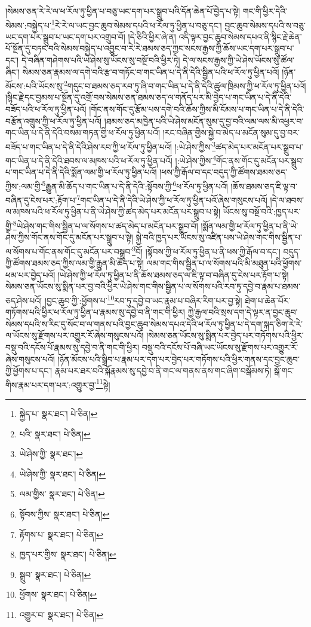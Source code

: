 །སེམས་ཅན་རེ་རེ་ལ་ཕ་རོལ་ཏུ་ཕྱིན་པ་བཅུ་ཡང་དག་པར་སྒྲུབ་པའི་དོན་ཆེན་པོ་བྱེད་པ་སྟེ། གང་གི་ཕྱིར་དེའི་སེམས་:བསྐྱེད་པ་\footnote{སྐྱེད་པ་  སྣར་ཐང་།  པེ་ཅིན། }རེ་རེ་ལ་ཡང་བྱང་ཆུབ་སེམས་དཔའི་ཕ་རོལ་ཏུ་ཕྱིན་པ་བཅུ་དང་། བྱང་ཆུབ་སེམས་དཔའི་ས་བཅུ་ཡང་དག་པར་སྒྲུབ་པ་ཡང་དག་པར་འགྲུབ་བོ། །དེ་ཅིའི་ཕྱིར་ཞེ་ན། འདི་ལྟར་བྱང་ཆུབ་སེམས་དཔའ་ནི་སྙིང་རྗེ་ཆེན་པོ་སྔོན་དུ་བཏང་བའི་སེམས་བསྐྱེད་པ་འབྱུང་བ་རེ་རེ་ཐམས་ཅད་ཀྱང་སངས་རྒྱས་ཀྱི་ཆོས་ཡང་དག་པར་སྒྲུབ་པ་དང་། དེ་བཞིན་གཤེགས་པའི་ཡེ་ཤེས་སུ་ཡོངས་སུ་བསྔོ་བའི་ཕྱིར་ཏེ། དེ་ལ་སངས་རྒྱས་ཀྱི་ཡེ་ཤེས་ཡོངས་སུ་ཚོལ་ཞིང་། སེམས་ཅན་རྣམས་ལ་དགེ་བའི་རྩ་བ་གཏོང་བ་གང་ཡིན་པ་དེ་ནི་དེའི་སྦྱིན་པའི་ཕ་རོལ་ཏུ་ཕྱིན་པའོ། །ཉོན་མོངས་:པའི་ཡོངས་སུ་\footnote{པའི་  སྣར་ཐང་།  པེ་ཅིན། }གདུང་བ་ཐམས་ཅད་རབ་ཏུ་ཞི་བ་གང་ཡིན་པ་དེ་ནི་དེའི་ཚུལ་ཁྲིམས་ཀྱི་ཕ་རོལ་ཏུ་ཕྱིན་པའོ། །སྙིང་རྗེ་དང་བྱམས་པ་སྔོན་དུ་འགྲོ་བས་སེམས་ཅན་ཐམས་ཅད་ལ་གནོད་པར་མི་བྱེད་པ་གང་ཡིན་པ་དེ་ནི་དེའི་བཟོད་པའི་ཕ་རོལ་ཏུ་ཕྱིན་པའོ། །གོང་ནས་གོང་དུ་རྩོམ་པས་དགེ་བའི་ཆོས་ཀྱིས་མི་ངོམས་པ་གང་ཡིན་པ་དེ་ནི་དེའི་བརྩོན་འགྲུས་ཀྱི་ཕ་རོལ་ཏུ་ཕྱིན་པའོ། །ཐམས་ཅད་མཁྱེན་པའི་ཡེ་ཤེས་མངོན་སུམ་དུ་བྱ་བའི་ལམ་ལས་མི་འཕྱར་བ་གང་ཡིན་པ་དེ་ནི་དེའི་བསམ་གཏན་གྱི་ཕ་རོལ་ཏུ་ཕྱིན་པའོ། །རང་བཞིན་གྱིས་སྐྱེ་བ་མེད་པ་མངོན་སུམ་དུ་བྱ་བར་བཟོད་པ་གང་ཡིན་པ་དེ་ནི་དེའི་ཤེས་རབ་ཀྱི་ཕ་རོལ་ཏུ་ཕྱིན་པའོ། །:ཡེ་ཤེས་ཀྱིས་\footnote{ཡེ་ཤེས་ཀྱི་  སྣར་ཐང་། }ཚད་མེད་པར་མངོན་པར་སྒྲུབ་པ་གང་ཡིན་པ་དེ་ནི་དེའི་ཐབས་ལ་མཁས་པའི་ཕ་རོལ་ཏུ་ཕྱིན་པའོ། །:ཡེ་ཤེས་ཀྱིས་\footnote{ཡེ་ཤེས་ཀྱི་  སྣར་ཐང་།  པེ་ཅིན། }གོང་ནས་གོང་དུ་མངོན་པར་སྒྲུབ་པ་གང་ཡིན་པ་དེ་ནི་དེའི་སྨོན་ལམ་གྱི་ཕ་རོལ་ཏུ་ཕྱིན་པའོ། །ཕས་ཀྱི་རྒོལ་བ་དང་བདུད་ཀྱི་ཚོགས་ཐམས་ཅད་ཀྱིས་:ལམ་གྱི་\footnote{ལམ་གྱིས་  སྣར་ཐང་།  པེ་ཅིན། }རྒྱུན་མི་ཆོད་པ་གང་ཡིན་པ་དེ་ནི་དེའི་:སྟོབས་ཀྱི་\footnote{སྟོབས་ཀྱིས་  སྣར་ཐང་།  པེ་ཅིན། }ཕ་རོལ་ཏུ་ཕྱིན་པའོ། །ཆོས་ཐམས་ཅད་ཇི་ལྟ་བ་བཞིན་དུ་ངེས་པར་:རྟོག་པ་\footnote{རྟོགས་པ་  སྣར་ཐང་།  པེ་ཅིན། }གང་ཡིན་པ་དེ་ནི་དེའི་ཡེ་ཤེས་ཀྱི་ཕ་རོལ་ཏུ་ཕྱིན་པའོ་ཞེས་གསུངས་པའོ། །དེ་ལ་ཐབས་ལ་མཁས་པའི་ཕ་རོལ་ཏུ་ཕྱིན་པ་ནི་ཡེ་ཤེས་ཀྱི་ཚད་མེད་པར་མངོན་པར་སྒྲུབ་པ་སྟེ། ཡོངས་སུ་བསྔོ་བའི་:ཁྱད་པར་གྱི་\footnote{ཁྱད་པར་གྱིས་  སྣར་ཐང་།  པེ་ཅིན། }ཡེ་ཤེས་གང་གིས་སྦྱིན་པ་ལ་སོགས་པ་ཚད་མེད་པ་མངོན་པར་སྒྲུབ་བོ། །སྨོན་ལམ་གྱི་ཕ་རོལ་ཏུ་ཕྱིན་པ་ནི་ཡེ་ཤེས་ཀྱིས་གོང་ནས་གོང་དུ་མངོན་པར་སྒྲུབ་པ་སྟེ། སྐྱེ་བའི་ཁྱད་པར་ཡོངས་སུ་འཛིན་པས་ཡེ་ཤེས་གང་གིས་སྦྱིན་པ་ལ་སོགས་པ་གོང་ནས་གོང་དུ་མངོན་པར་བསྒྲུབ་\footnote{སྒྲུབ་  སྣར་ཐང་།  པེ་ཅིན། }བོ། །སྟོབས་ཀྱི་ཕ་རོལ་ཏུ་ཕྱིན་པ་ནི་ཕས་ཀྱི་རྒོལ་བ་དང་། བདུད་ཀྱི་ཚོགས་ཐམས་ཅད་ཀྱིས་ལམ་གྱི་རྒྱུན་མི་ཆོད་པ་སྟེ། ལམ་གང་གིས་སྦྱིན་པ་ལ་སོགས་པའི་མི་མཐུན་པའི་ཕྱོགས་ཕམ་པར་བྱེད་པའོ། །ཡེ་ཤེས་ཀྱི་ཕ་རོལ་ཏུ་ཕྱིན་པ་ནི་ཆོས་ཐམས་ཅད་ལ་ཇི་ལྟ་བ་བཞིན་དུ་ངེས་པར་རྟོག་པ་སྟེ། སེམས་ཅན་ཡོངས་སུ་སྨིན་པར་བྱ་བའི་ཕྱིར་ཡེ་ཤེས་གང་གིས་སྦྱིན་པ་ལ་སོགས་པའི་རབ་ཏུ་དབྱེ་བ་རྣམ་པ་ཐམས་ཅད་ཤེས་པའོ། །བྱང་ཆུབ་ཀྱི་:ཕྱོགས་པ་\footnote{ཕྱོགས་  སྣར་ཐང་།  པེ་ཅིན། }རབ་ཏུ་དབྱེ་བ་ཡང་རྣམ་པ་བཞིར་རིག་པར་བྱ་སྟེ། ཐེག་པ་ཆེན་པོར་གཏོགས་པའི་ཕྱིར་ཕ་རོལ་ཏུ་ཕྱིན་པ་རྣམས་སུ་དབྱེ་བ་ནི་གང་གི་ཕྱིར། ཀྱེ་རྒྱལ་བའི་སྲས་དག་དེ་ལྟར་ན་བྱང་ཆུབ་སེམས་དཔའི་ས་རིང་དུ་སོང་བ་ལ་གནས་པའི་བྱང་ཆུབ་སེམས་དཔའ་དེའི་ཕ་རོལ་ཏུ་ཕྱིན་པ་དེ་དག་སྐད་ཅིག་རེ་རེ་ལ་ཡོངས་སུ་རྫོགས་པར་འགྱུར་རོ་ཞེས་གསུངས་པའོ། །སེམས་ཅན་ཡོངས་སུ་སྨིན་པར་བྱེད་པར་གཏོགས་པའི་ཕྱིར་བསྡུ་བའི་དངོས་པོ་རྣམས་སུ་དབྱེ་བ་ནི་གང་གི་ཕྱིར། བསྡུ་བའི་དངོས་པོ་བཞི་ཡང་ཡོངས་སུ་རྫོགས་པར་འགྱུར་རོ་ཞེས་གསུངས་པའོ། །ཉོན་མོངས་པའི་སྒྲིབ་པ་རྣམ་པར་དག་པར་བྱེད་པར་གཏོགས་པའི་ཕྱིར་གནས་དང་བྱང་ཆུབ་ཀྱི་ཕྱོགས་པ་དང་། རྣམ་པར་ཐར་བའི་སྐོརྣམས་སུ་དབྱེ་བ་ནི་གང་ལ་གནས་ནས་གང་ཞིག་བསྒོམས་ཏེ། སྒོ་གང་གིས་རྣམ་པར་དག་པར་:འགྱུར་བྱ་\footnote{འགྱུར་བ་  སྣར་ཐང་།  པེ་ཅིན། }སྟེ། 